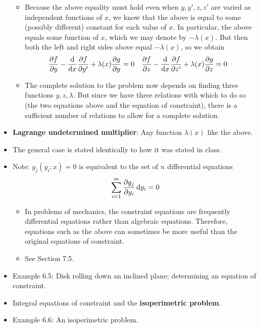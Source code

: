 \documentclass[../notes.tex]{subfiles}
\begin{document}
\begin{itemize}
\begin{itemize}
\begin{equation*}
        \end{equation*}
        \item Because the above equality must hold even when $y,y',z,z'$ are varied as independent functions of $x$, we know that the above is equal to some (possibly different) constant for each value of $x$. In particular, the above equals some function of $x$, which we may denote by $-\lambda(x)$. But then both the left and right sides above equal $-\lambda(x)$, so we obtain
        \begin{align*}
            \pdv{f}{y}-\dv{x}\pdv{f}{y'}+\lambda(x)\pdv{g}{y} &= 0&
            \pdv{f}{z}-\dv{x}\pdv{f}{z'}+\lambda(x)\pdv{g}{z} &= 0
        \end{align*}
        \item The complete solution to the problem now depends on finding three functions $y,z,\lambda$. But since we have three relations with which to do so (the two equations above and the equation of constraint), there is a sufficient number of relations to allow for a complete solution.
    \end{itemize}
    \item \textbf{Lagrange undetermined multiplier}: Any function $\lambda(x)$ like the above.
    \item The general case is stated identically to how it was stated in class.
    \item Note: $g_j(y_i;x)=0$ is equivalent to the set of $n$ differential equations
    \begin{equation*}
        \sum_{i=1}^m\pdv{g_j}{y_i}\dd{y_i} = 0
    \end{equation*}
    \begin{itemize}
        \item In problems of mechanics, the constraint equations are frequently differential equations rather than algebraic equations. Therefore, equations such as the above can sometimes be more useful than the original equations of constraint.
        \item See Section 7.5.
    \end{itemize}
    \item Example 6.5: Disk rolling down an inclined plane; determining an equation of constraint.
    \item Integral equations of constraint and the \textbf{isoperimetric problem}.
    \item Example 6.6: An isoperimetric problem.
\end{itemize}
\end{document}

